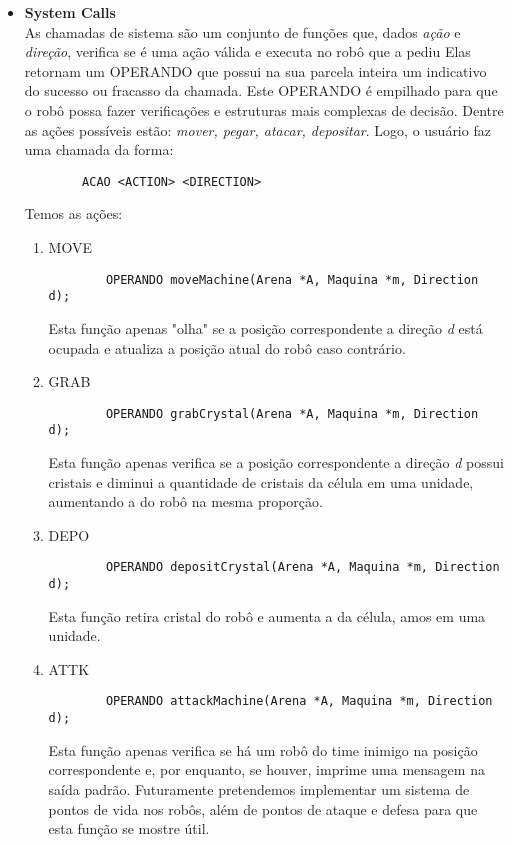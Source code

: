 \documentclass{article}
\begin{document}
\begin{itemize}
    \item \textbf{System Calls} \\
    As chamadas de sistema s\~ao um conjunto de fun\c c\~oes que, dados \textit{a\c c\~ao} e \textit{dire\c c\~ao}, verifica se \'e uma a\c c\~ao v\'alida e executa no rob\^o que a pediu Elas retornam um OPERANDO que possui na sua parcela inteira um indicativo do sucesso ou fracasso da chamada. Este OPERANDO \'e empilhado para que o rob\^o possa fazer verifica\c c\~oes e estruturas mais complexas de decis\~ao. Dentre as a\c c\~oes poss\'iveis est\~ao: \textit{mover, pegar, atacar, depositar}. Logo, o usu\'ario faz uma chamada da forma:
    \begin{lstlisting}
        ACAO <ACTION> <DIRECTION>
    \end{lstlisting}
    Temos as a\c c\~oes:
    \begin{enumerate}
        \item MOVE
        \begin{lstlisting}
        OPERANDO moveMachine(Arena *A, Maquina *m, Direction d);
        \end{lstlisting}
        Esta fun\c c\~ao apenas "olha" se a posi\c c\~ao correspondente a dire\c c\~ao \textit{d} est\'a ocupada e atualiza a posi\c c\~ao atual do rob\^o caso contr\'ario.
        
        \item GRAB
        \begin{lstlisting}
        OPERANDO grabCrystal(Arena *A, Maquina *m, Direction d);
        \end{lstlisting}
        Esta fun\c c\~ao apenas verifica se a posi\c c\~ao correspondente a dire\c c\~ao \textit{d} possui cristais e diminui a quantidade de cristais da c\'elula em uma unidade, aumentando a do rob\^o na mesma propor\c c\~ao.
        
        \item DEPO
        \begin{lstlisting}
        OPERANDO depositCrystal(Arena *A, Maquina *m, Direction d);
        \end{lstlisting}
        Esta fun\c c\~ao retira cristal do rob\^o e aumenta a da c\'elula, amos em uma unidade.
        \item ATTK
        \begin{lstlisting}
        OPERANDO attackMachine(Arena *A, Maquina *m, Direction d);
        \end{lstlisting}
        Esta fun\c c\~ao apenas verifica se h\'a um rob\^o do time inimigo na posi\c c\~ao correspondente e, por enquanto, se houver, imprime uma mensagem na sa\'ida padr\~ao. Futuramente pretendemos implementar um sistema de pontos de vida nos rob\^os, al\'em de pontos de ataque e defesa para que esta fun\c c\~ao se mostre \'util.
    \end{enumerate}
    

\end{itemize}
\end{document}
